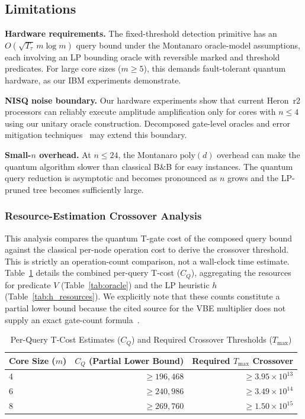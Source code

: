 \documentclass[conference]{IEEEtran} \IEEEoverridecommandlockouts
\begin{document}
\subsection{Limitations}

\textbf{Hardware requirements.} The fixed-threshold detection primitive has an $O(\sqrt{T_{\tau}}\,m\log m)$ query bound under the Montanaro oracle-model assumptions, each involving an LP bounding oracle with reversible marked and threshold predicates. For large core sizes ($m \geq 5$), this demands fault-tolerant quantum hardware, as our IBM experiments demonstrate.

\textbf{NISQ noise boundary.} Our hardware experiments show that current Heron~r2 processors can reliably execute amplitude amplification only for cores with $n \leq 4$ using our unitary oracle construction. Decomposed gate-level oracles and error mitigation techniques~\cite{ref31} may extend this boundary.

\textbf{Small-$n$ overhead.} At $n \leq 24$, the Montanaro $\text{poly}(d)$ overhead can make the quantum algorithm slower than classical B\&B for easy instances. The quantum query reduction is asymptotic and becomes pronounced as $n$ grows and the LP-pruned tree becomes sufficiently large.

\subsubsection{Resource-Estimation Crossover Analysis}
This analysis compares the quantum T-gate cost of the composed query bound against the classical per-node operation cost to derive the crossover threshold. This is strictly an operation-count comparison, not a wall-clock time estimate. Table~\ref{tab:crossover} details the combined per-query T-cost ($C_Q$), aggregating the resources for predicate $V$ (Table~\ref{tab:oracle}) and the LP heuristic $h$ (Table~\ref{tab:h_resources}). We explicitly note that these counts constitute a partial lower bound because the cited source for the VBE multiplier does not supply an exact gate-count formula~\cite{vedral1996}.

\begin{table}[htbp]
\caption{Per-Query T-Cost Estimates ($C_Q$) and Required Crossover Thresholds ($T_{\max}$)}
\label{tab:crossover}
\begin{center}
\begin{tabular}{lrr}
\toprule
\textbf{Core Size ($m$)} & \textbf{$C_Q$ (Partial Lower Bound)} & \textbf{Required $T_{\max}$ Crossover} \\
\midrule
4 & $\ge 196{,}468$ & $\ge 3.95 \times 10^{13}$ \\
6 & $\ge 240{,}986$ & $\ge 3.49 \times 10^{14}$ \\
8 & $\ge 269{,}760$ & $\ge 1.50 \times 10^{15}$ \\
\bottomrule
\end{tabular}
\end{center}
\end{table}
\end{document}
